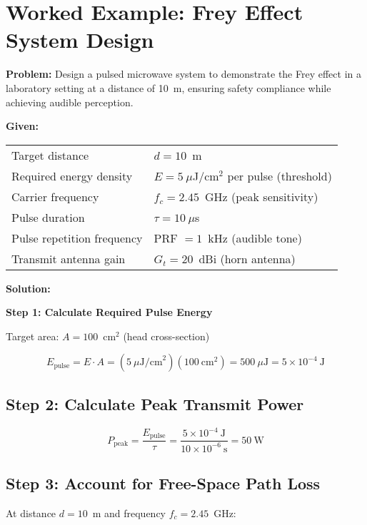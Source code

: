 \section{Worked Example: Frey Effect System Design}

\textbf{Problem:} Design a pulsed microwave system to demonstrate the Frey effect in a laboratory setting at a distance of 10~m, ensuring safety compliance while achieving audible perception.

\textbf{Given:}

\begin{tabular}{@{}ll@{}}
Target distance & $d = 10$~m \\
Required energy density & $E = 5~\mu$J/cm$^2$ per pulse (threshold) \\
Carrier frequency & $f_c = 2.45$~GHz (peak sensitivity) \\
Pulse duration & $\tau = 10~\mu$s \\
Pulse repetition frequency & PRF $= 1$~kHz (audible tone) \\
Transmit antenna gain & $G_t = 20$~dBi (horn antenna) \\
\end{tabular}

\textbf{Solution:}

\textbf{Step 1: Calculate Required Pulse Energy}

Target area: $A = 100$~cm$^2$ (head cross-section)

\begin{equation}
E_{\text{pulse}} = E \cdot A = (5~\mu\text{J/cm}^2)(100~\text{cm}^2) = 500~\mu\text{J} = 5 \times 10^{-4}~\text{J}
\end{equation}

\subsection*{Step 2: Calculate Peak Transmit Power}

\begin{equation}
P_{\text{peak}} = \frac{E_{\text{pulse}}}{\tau} = \frac{5 \times 10^{-4}~\text{J}}{10 \times 10^{-6}~\text{s}} = 50~\text{W}
\end{equation}

\subsection*{Step 3: Account for Free-Space Path Loss}

At distance $d = 10$~m and frequency $f_c = 2.45$~GHz:

